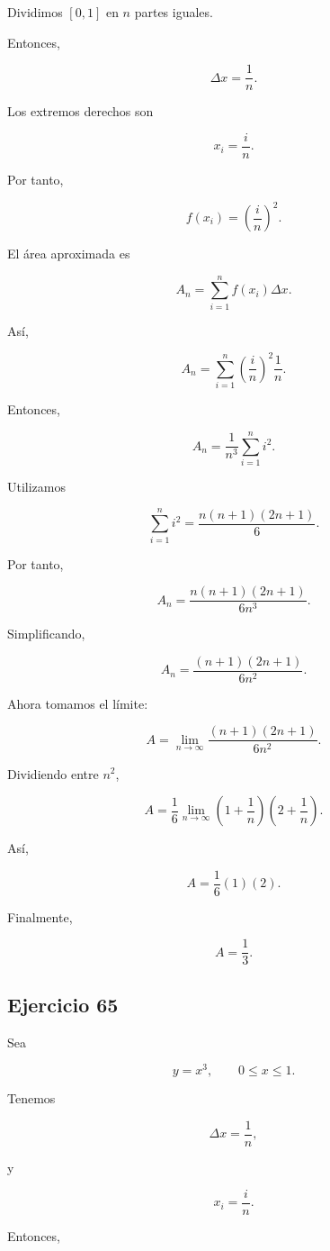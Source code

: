 \documentclass[12pt]{article}
\begin{document}
Dividimos \([0,1]\) en \(n\) partes iguales.

Entonces,

\[
\Delta x
=
\frac1n.
\]

Los extremos derechos son

\[
x_i
=
\frac{i}{n}.
\]

Por tanto,

\[
f(x_i)
=
\left(\frac{i}{n}\right)^2.
\]

El área aproximada es

\[
A_n
=
\sum_{i=1}^{n}
f(x_i)\Delta x.
\]

Así,

\[
A_n
=
\sum_{i=1}^{n}
\left(\frac{i}{n}\right)^2
\frac1n.
\]

Entonces,

\[
A_n
=
\frac{1}{n^3}
\sum_{i=1}^{n}i^2.
\]

Utilizamos

\[
\sum_{i=1}^{n}i^2
=
\frac{n(n+1)(2n+1)}{6}.
\]

Por tanto,

\[
A_n
=
\frac{n(n+1)(2n+1)}{6n^3}.
\]

Simplificando,

\[
A_n
=
\frac{(n+1)(2n+1)}{6n^2}.
\]

Ahora tomamos el límite:

\[
A
=
\lim_{n\to\infty}
\frac{(n+1)(2n+1)}{6n^2}.
\]

Dividiendo entre \(n^2\),

\[
A
=
\frac16
\lim_{n\to\infty}
\left(1+\frac1n\right)
\left(2+\frac1n\right).
\]

Así,

\[
A
=
\frac16(1)(2).
\]

Finalmente,

\[
\boxed{
A=\frac13
}.
\]

\subsection*{Ejercicio 65}

Sea

\[
y=x^3,
\qquad
0\leq x\leq1.
\]

Tenemos

\[
\Delta x=\frac1n,
\]

y

\[
x_i=\frac{i}{n}.
\]

Entonces,
\end{document}
